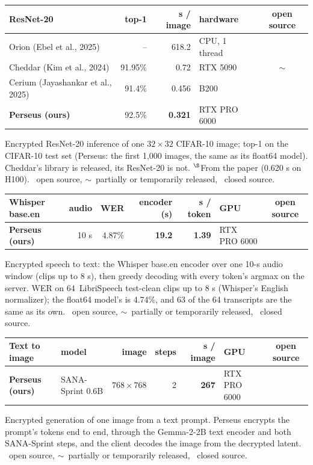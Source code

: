\documentclass[border={14pt 4pt 14pt 4pt},varwidth=17.2cm,multi=tbl]{standalone}
\newcommand{\resnetimg}{0.321}\newcommand{\resnetmem}{35.5}\newcommand{\resnettop}{92.5}
\newcommand{\sanaimg}{267}\newcommand{\sanamem}{76.7}
\newcommand{\whisperenc}{19.2}\newcommand{\whisperdec}{1.39}\newcommand{\whisperencmem}{70.0}\newcommand{\whisperdecmem}{56.9}
\newcommand{\whisperwer}{4.87}\newcommand{\whisperfloatwer}{4.74}\newcommand{\whisperclips}{64}
\newcommand{\oursrow}{\rowcolor{ours}}
\newcommand{\yes}{\textcolor{yescol}{\ding{51}}}
\newcommand{\no}{\textcolor{nocol}{\ding{55}}}
\newcommand{\semi}{$\sim$}
\newcommand{\nt}[1]{\rlap{$^{#1}$}}
\newcommand{\tcap}[1]{\par\vspace{6pt}\begin{minipage}{\linewidth}\fontsize{11.5}{14.5}\selectfont #1\end{minipage}}
\newcommand{\legend}{\yes\ open source, \semi\ partially or temporarily released, \no\ closed source.}
\newenvironment{tbl}{\centering\setlength{\tabcolsep}{7pt}\renewcommand{\arraystretch}{1.18}}{}
\begin{document}
\begin{tbl}
\begin{tabularx}{\linewidth}{L{1.4}rrL{0.6}c}
\toprule
\textbf{ResNet-20} & top-1 & s / image & hardware & open source \\
\midrule
Orion (Ebel et al., 2025) & -- & 618.2 & CPU, 1 thread & \yes \\
Cheddar (Kim et al., 2024) & 91.95\% & 0.72 & RTX 5090 & \semi \\
Cerium (Jayashankar et al., 2025) & 91.4\% & 0.456\nt{\S} & B200 & \yes \\
\oursrow\textbf{Perseus (ours)} & \resnettop\% & \textbf{\resnetimg} & RTX PRO 6000 & \yes \\
\bottomrule
\end{tabularx}
\tcap{Encrypted ResNet-20 inference of one $32\times32$ CIFAR-10 image; top-1 on the CIFAR-10 test set (Perseus: the
first 1,000 images, the same as its float64 model). Cheddar's library is released, its ResNet-20 is not. $^\S$From the
paper (0.620 s on H100). \legend}
\end{tbl}

\begin{tbl}
\begin{tabularx}{\linewidth}{Xrrrrlc}
\toprule
\textbf{Whisper base.en} & audio & WER & encoder (s) & s / token & GPU & open source \\
\midrule
\oursrow\textbf{Perseus (ours)} & 10 s & \whisperwer\% & \textbf{\whisperenc} & \textbf{\whisperdec} & RTX PRO 6000 & \yes \\
\bottomrule
\end{tabularx}
\tcap{Encrypted speech to text: the Whisper base.en encoder over one 10-s audio window (clips up to 8 s), then greedy
decoding with every token's argmax on the server. WER on \whisperclips\ LibriSpeech test-clean clips up to 8 s (Whisper's
English normalizer); the float64 model's is \whisperfloatwer\%, and 63 of the 64 transcripts are the same as its own. \legend}
\end{tbl}

\begin{tbl}
\begin{tabularx}{\linewidth}{Xlrrrlc}
\toprule
\textbf{Text to image} & model & image & steps & s / image & GPU & open source \\
\midrule
\oursrow\textbf{Perseus (ours)} & SANA-Sprint 0.6B & $768\times768$ & 2 & \textbf{\sanaimg} & RTX PRO 6000 & \yes \\
\bottomrule
\end{tabularx}
\tcap{Encrypted generation of one image from a text prompt. Perseus encrypts the prompt's tokens end to end, through the
Gemma-2-2B text encoder and both SANA-Sprint steps, and the client decodes the image from the decrypted latent.
\legend}
\end{tbl}
\end{document}
